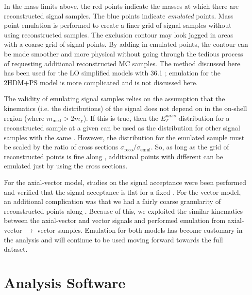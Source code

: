 In the mass limits above, the red points indicate the masses at which there are reconstructed signal samples. The blue points indicate \textit{emulated} points. Mass point emulation is performed to create a finer grid of signal samples without using reconstructed samples. The exclusion contour may look jagged in areas with a coarse grid of signal points. By adding in emulated points, the contour can be made smoother and more physical without going through the tedious process of requesting additional reconstructed MC samples. The method discussed here has been used for the LO simplified models with 36.1 \ifb; emulation for the 2HDM+PS model is more complicated and is not discussed here. 

The validity of emulating signal samples relies on the assumption that the kinematics (i.e. the \etmiss distributions) of the signal does not depend on \mchi in the on-shell region (where $m_\text{med} > 2 m_\chi$). If this is true, then the $E_T^{miss}$ distribution for a reconstructed sample at a given \mmed can be used as the \etmiss distribution for other signal samples with the same \mmed. However, the \etmiss distribution for the emulated sample must be scaled by the ratio of cross sections $\sigma_\text{reco}/\sigma_\text{emul}$. So, as long as the grid of reconstructed points is fine along \mmed, additional points with different \mchi can be emulated just by using the cross sections.

For the axial-vector model, studies on the signal acceptance were been performed and verified that the signal acceptance is flat for a fixed \mmed. For the vector model, an additional complication was that we had a fairly coarse granularity of reconstructed points along \mmed. Because of this, we exploited the similar kinematics between the axial-vector and vector signals and performed emulation from axial-vector $\rightarrow$ vector samples. Emulation for both models has become customary in the \monoZ analysis and will continue to be used moving forward towards the full dataset.


\section{Analysis Software}
\label{sec:code}

